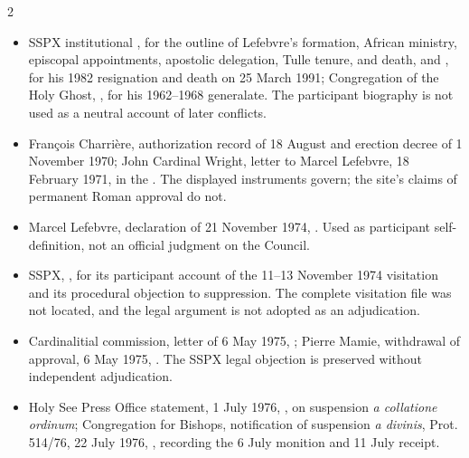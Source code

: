 \begin{multicols}{2}
{\footnotesize
\begin{itemize}[itemsep=0.1em,topsep=0.15em]
\item SSPX institutional , for the outline of Lefebvre's formation, African ministry, episcopal appointments, apostolic delegation, Tulle tenure, and death, and , for his 1982 resignation and death on 25 March 1991; Congregation of the Holy Ghost, , for his 1962--1968 generalate. The participant biography is not used as a neutral account of later conflicts.
\item François Charrière, authorization record of 18 August and erection decree of 1 November 1970; John Cardinal Wright, letter to Marcel Lefebvre, 18 February 1971, in the . The displayed instruments govern; the site's claims of permanent Roman approval do not.
\item Marcel Lefebvre, declaration of 21 November 1974, . Used as participant self-definition, not an official judgment on the Council.
\item SSPX, , for its participant account of the 11--13 November 1974 visitation and its procedural objection to suppression. The complete visitation file was not located, and the legal argument is not adopted as an adjudication.
\item Cardinalitial commission, letter of 6 May 1975, ; Pierre Mamie, withdrawal of approval, 6 May 1975, . The SSPX legal objection is preserved without independent adjudication.
\item Holy See Press Office statement, 1 July 1976, , on suspension \emph{a collatione ordinum}; Congregation for Bishops, notification of suspension \emph{a divinis}, Prot. 514/76, 22 July 1976, , recording the 6 July monition and 11 July receipt.

\end{itemize}}
\end{multicols}
